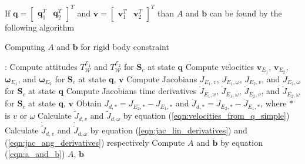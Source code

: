 If $\mathbf{q} = \begin{bmatrix} \mathbf{q}_1^T & \mathbf{q}_2^T \end{bmatrix}^T$ 
and $\mathbf{v} = \begin{bmatrix} \mathbf{v}_1^T & \mathbf{v}_2^T \end{bmatrix}^T$ 
than $A$ and $\mathbf{b}$ can be found by the following algorithm

\begin{algorithm}[H]
    \caption{Computing $A$ and $\mathbf{b}$ for rigid body constraint}

    \begin{algorithmic}[1]
         : 
        \State Compute attitudes $T_{\mathcal{W}}^{\mathcal{E}_1}$ and 
        $T_{\mathcal{W}}^{\mathcal{E}_2}$ for $\mathbf{S}_c$ at state $\mathbf{q}$
        \State Compute velocities $\mathbf{v}_{E_1}$, $\mathbf{v}_{E_2}$, 
        $\boldsymbol{\omega}_{E_1}$, and $\boldsymbol{\omega}_{E_2}$
        for $\mathbf{S}_c$ at state $\mathbf{q}$, $\mathbf{v}$
        \State Compute Jacobians $J_{E_1, v}$, $J_{E_1, \omega}$, $J_{E_2, v}$, and 
        $J_{E_2, \omega}$ for $\mathbf{S}_c$ at state $\mathbf{q}$
        \State Compute Jacobians time derivatives $\dot{J}_{E_1, v}$, 
        $\dot{J}_{E_1, \omega}$, $\dot{J}_{E_2, v}$, and $\dot{J}_{E_2, \omega}$ 
        for $\mathbf{S}_c$ at state $\mathbf{q}$, $\mathbf{v}$
        \State Obtain $J_{d, *} = J_{E_2, *} - J_{E_1, *}$ and 
        $\dot{J}_{d, *} = \dot{J}_{E_2, *} - \dot{J}_{E_1, *}$, where $*$ is 
        $v$ or $\omega$
        \State Calculate $\tilde{J}_{d,v}$ and $\tilde{J}_{d, \omega}$ by equation 
        (\ref{eqn:velocities_from_q_simple})
        \State Calculate $\dot{\tilde{J}}_{d,v}$ and $\dot{\tilde{J}}_{d, \omega}$ by 
        equation (\ref{eqn:jac_lin_derivatives}) and (\ref{eqn:jac_ang_derivatives}) 
        respectively
        \State Compute $A$ and $\mathbf{b}$ by equation (\ref{eqn:a_and_b})
        \State \Return $A$, $\mathbf{b}$
        \EndFunction
    \end{algorithmic}

    \label{alg:get_a_and_b}
\end{algorithm}
